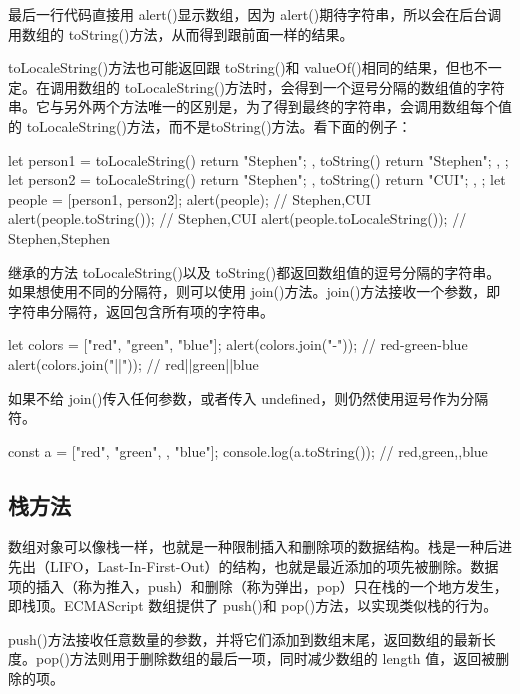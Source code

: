 最后一行代码直接用 alert()显示数组，因为 alert()期待字符串，所以会在后台调用数组的 toString()方法，从而得到跟前面一样的结果。

toLocaleString()方法也可能返回跟 toString()和 valueOf()相同的结果，但也不一定。在调用数组的 toLocaleString()方法时，会得到一个逗号分隔的数组值的字符串。它与另外两个方法唯一的区别是，为了得到最终的字符串，会调用数组每个值的 toLocaleString()方法，而不是toString()方法。看下面的例子：
\begin{js}
    let person1 = {
    toLocaleString() {
            return "Stephen";
        },
    toString() {
            return "Stephen";
        },
    };
    let person2 = {
    toLocaleString() {
            return "Stephen";
        },
    toString() {
            return "CUI";
        },
    };
    let people = [person1, person2];
    alert(people); // Stephen,CUI
    alert(people.toString()); // Stephen,CUI
    alert(people.toLocaleString()); // Stephen,Stephen
\end{js}

继承的方法 toLocaleString()以及 toString()都返回数组值的逗号分隔的字符串。如果想使用不同的分隔符，则可以使用 join()方法。join()方法接收一个参数，即字符串分隔符，返回包含所有项的字符串。

\begin{js}
    let colors = ["red", "green", "blue"];
    alert(colors.join("-")); // red-green-blue
    alert(colors.join("||")); // red||green||blue
\end{js}

如果不给 join()传入任何参数，或者传入 undefined，则仍然使用逗号作为分隔符。


\begin{js}
    const a = ["red", "green", , "blue"];
    console.log(a.toString()); // red,green,,blue
\end{js}
\subsection{栈方法}
数组对象可以像栈一样，也就是一种限制插入和删除项的数据结构。栈是一种后进先出（LIFO，Last-In-First-Out）的结构，也就是最近添加的项先被删除。数据项的插入（称为推入，push）和删除（称为弹出，pop）只在栈的一个地方发生，即栈顶。ECMAScript 数组提供了 push()和 pop()方法，以实现类似栈的行为。

push()方法接收任意数量的参数，并将它们添加到数组末尾，返回数组的最新长度。pop()方法则用于删除数组的最后一项，同时减少数组的 length 值，返回被删除的项。

